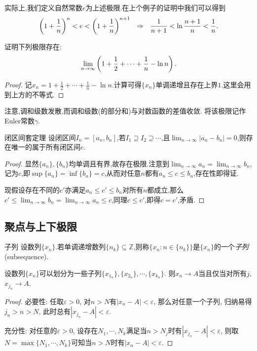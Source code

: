 实际上,我们定义自然常数$e$为上述极限.在上个例子的证明中我们可以得到$$\left( 1+\frac{1}{n} \right)^n < e < \left( 1+\frac{1}{n} \right)^{n+1} ~~\Rightarrow ~~ \frac{1}{n+1} < \ln \frac{n+1}{n} < \frac{1}{n}.$$

\begin{example}
	证明下列极限存在:$$\lim_{n\to \infty} \left(  1+\frac{1}{2}+\cdots + \frac{1}{n}-\ln n  \right).$$
\end{example}
\begin{proof}
	记$x_n=1+\frac{1}{2}+\cdots + \frac{1}{n}-\ln n$.计算可得$\{ x_n \}$单调递增且存在上界$1$.这里会用到上方的不等式.
\end{proof}

注意,调和级数发散,而调和级数(的部分和)与对数函数的差值收敛. 将该极限记作Euler常数$\gamma$.

\begin{theorem}{闭区间套定理} \label{thm:biqujmtc}
	设闭区间$I_n=[a_n,b_n]$,若$I_1 \supseteq I_2 \supseteq \cdots $,且$\lim_{n\to \infty} |a_n-b_n|=0$,则存在唯一的属于所有闭区间$c$. 
\end{theorem}
\begin{proof}
	显然$\{ a_n \},\{ b_n \}$均单调且有界,故存在极限.注意到$\lim_{n\to \infty} a_n = \lim_{n\to \infty} b_n$,记为$c$,即$\sup \{ a_n \} = \inf \{ b_n \} = c$,从而对任意$n$都有$a_n \leq c \leq b_n$,存在性即得证.
	
	现假设存在不同的$c'$亦满足$a_n \leq c' \leq b_n$对所有$n$都成立,那么$c' \leq \lim_{n\to \infty} b_n = \lim_{n\to \infty} a_n \leq c$,同理$c \leq c'$,即得$c=c'$,矛盾.
\end{proof}

\subsection{聚点与上下极限}

\begin{definition}{子列}
	设数列$\{ x_n \}$.若单调递增数列$\{ n_k \} \subseteq \mathbb{Z}$,则称$\{ x_n:n \in  \{ n_k \} \}$是$\{ x_n \}$的一个\textit{子列}(subsequence).
\end{definition}

\begin{proposition}{}
	设数列$\{ x_n \}$可以划分为一些子列$\{ x_{1_n} \},\{ x_{2_n} \},\cdots ,\{ x_{k_n} \}$. 则$x_n \to A$当且仅当对所有$j$, $x_{j_n} \to A$. 
\end{proposition}
\begin{proof}
	必要性: 任取$\varepsilon >0$, 对$n>N$有$|x_n-A|<\varepsilon$, 那么对任意一个子列, 归纳易得$j_n>n>N$, 此时总有$|x_{j_n}-A|<\varepsilon$.
	
	充分性: 对任意的$\varepsilon >0$, 设存在$N_1,\cdots ,N_k$满足当$n>N_j$时有$|x_{j_n}-A|<\varepsilon$, 则取$N=\max \{ N_1,\cdots ,N_k \}$可知当$n>N$时有$|x_n-A|<\varepsilon$.
\end{proof}

